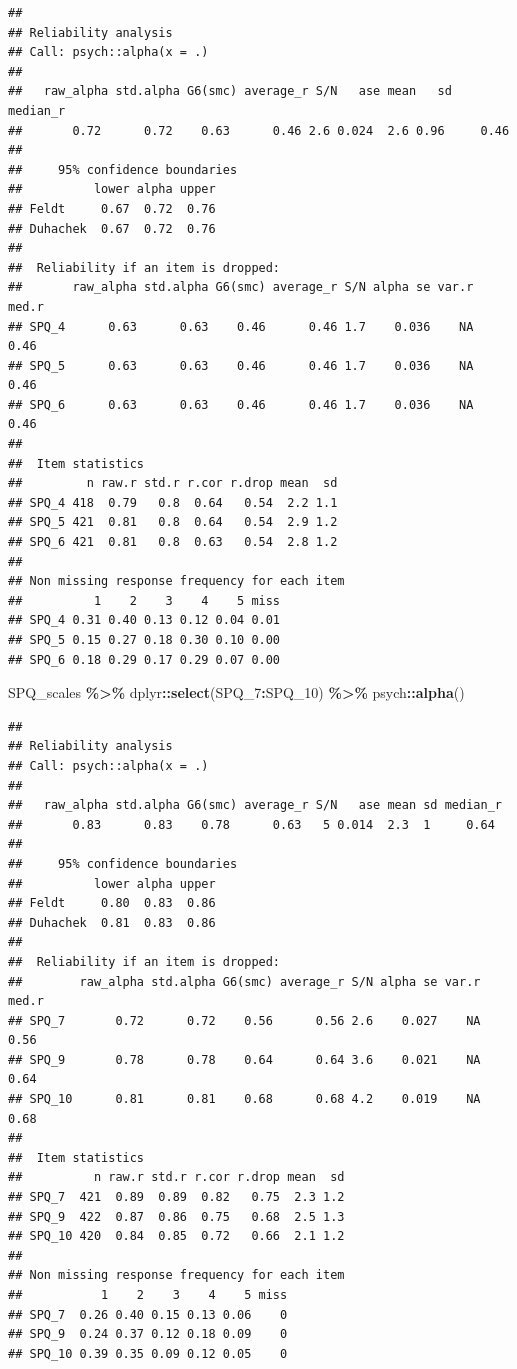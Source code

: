\documentclass[
]{article}
\newenvironment{Shaded}{\begin{snugshade}}{\end{snugshade}}
\newcommand{\FunctionTok}[1]{\textcolor[rgb]{0.13,0.29,0.53}{\textbf{#1}}}
\newcommand{\NormalTok}[1]{#1}
\newcommand{\SpecialCharTok}[1]{\textcolor[rgb]{0.81,0.36,0.00}{\textbf{#1}}}
\begin{document}
\begin{verbatim}
## 
## Reliability analysis   
## Call: psych::alpha(x = .)
## 
##   raw_alpha std.alpha G6(smc) average_r S/N   ase mean   sd median_r
##       0.72      0.72    0.63      0.46 2.6 0.024  2.6 0.96     0.46
## 
##     95% confidence boundaries 
##          lower alpha upper
## Feldt     0.67  0.72  0.76
## Duhachek  0.67  0.72  0.76
## 
##  Reliability if an item is dropped:
##       raw_alpha std.alpha G6(smc) average_r S/N alpha se var.r med.r
## SPQ_4      0.63      0.63    0.46      0.46 1.7    0.036    NA  0.46
## SPQ_5      0.63      0.63    0.46      0.46 1.7    0.036    NA  0.46
## SPQ_6      0.63      0.63    0.46      0.46 1.7    0.036    NA  0.46
## 
##  Item statistics 
##         n raw.r std.r r.cor r.drop mean  sd
## SPQ_4 418  0.79   0.8  0.64   0.54  2.2 1.1
## SPQ_5 421  0.81   0.8  0.64   0.54  2.9 1.2
## SPQ_6 421  0.81   0.8  0.63   0.54  2.8 1.2
## 
## Non missing response frequency for each item
##          1    2    3    4    5 miss
## SPQ_4 0.31 0.40 0.13 0.12 0.04 0.01
## SPQ_5 0.15 0.27 0.18 0.30 0.10 0.00
## SPQ_6 0.18 0.29 0.17 0.29 0.07 0.00
\end{verbatim}

\begin{Shaded}
\begin{Highlighting}[]
\NormalTok{SPQ\_scales }\SpecialCharTok{\%\textgreater{}\%}\NormalTok{ dplyr}\SpecialCharTok{::}\FunctionTok{select}\NormalTok{(SPQ\_7}\SpecialCharTok{:}\NormalTok{SPQ\_10) }\SpecialCharTok{\%\textgreater{}\%}\NormalTok{ psych}\SpecialCharTok{::}\FunctionTok{alpha}\NormalTok{()}
\end{Highlighting}
\end{Shaded}

\begin{verbatim}
## 
## Reliability analysis   
## Call: psych::alpha(x = .)
## 
##   raw_alpha std.alpha G6(smc) average_r S/N   ase mean sd median_r
##       0.83      0.83    0.78      0.63   5 0.014  2.3  1     0.64
## 
##     95% confidence boundaries 
##          lower alpha upper
## Feldt     0.80  0.83  0.86
## Duhachek  0.81  0.83  0.86
## 
##  Reliability if an item is dropped:
##        raw_alpha std.alpha G6(smc) average_r S/N alpha se var.r med.r
## SPQ_7       0.72      0.72    0.56      0.56 2.6    0.027    NA  0.56
## SPQ_9       0.78      0.78    0.64      0.64 3.6    0.021    NA  0.64
## SPQ_10      0.81      0.81    0.68      0.68 4.2    0.019    NA  0.68
## 
##  Item statistics 
##          n raw.r std.r r.cor r.drop mean  sd
## SPQ_7  421  0.89  0.89  0.82   0.75  2.3 1.2
## SPQ_9  422  0.87  0.86  0.75   0.68  2.5 1.3
## SPQ_10 420  0.84  0.85  0.72   0.66  2.1 1.2
## 
## Non missing response frequency for each item
##           1    2    3    4    5 miss
## SPQ_7  0.26 0.40 0.15 0.13 0.06    0
## SPQ_9  0.24 0.37 0.12 0.18 0.09    0
## SPQ_10 0.39 0.35 0.09 0.12 0.05    0
\end{verbatim}
\end{document}
